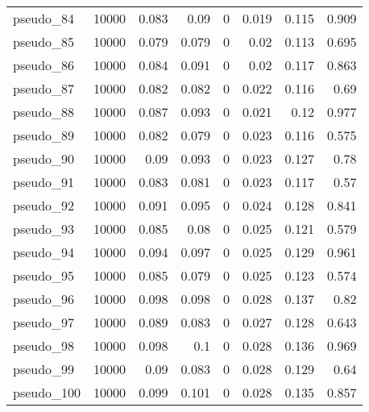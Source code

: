 \begin{table}[!htbp]
{\begin{tabular}{lrrrrrrr}
pseudo\_84 & 10000 & 0.083 & 0.09 & 0 & 0.019 & 0.115 & 0.909 \\ 
pseudo\_85 & 10000 & 0.079 & 0.079 & 0 & 0.02 & 0.113 & 0.695 \\ 
pseudo\_86 & 10000 & 0.084 & 0.091 & 0 & 0.02 & 0.117 & 0.863 \\ 
pseudo\_87 & 10000 & 0.082 & 0.082 & 0 & 0.022 & 0.116 & 0.69 \\ 
pseudo\_88 & 10000 & 0.087 & 0.093 & 0 & 0.021 & 0.12 & 0.977 \\ 
pseudo\_89 & 10000 & 0.082 & 0.079 & 0 & 0.023 & 0.116 & 0.575 \\ 
pseudo\_90 & 10000 & 0.09 & 0.093 & 0 & 0.023 & 0.127 & 0.78 \\ 
pseudo\_91 & 10000 & 0.083 & 0.081 & 0 & 0.023 & 0.117 & 0.57 \\ 
pseudo\_92 & 10000 & 0.091 & 0.095 & 0 & 0.024 & 0.128 & 0.841 \\ 
pseudo\_93 & 10000 & 0.085 & 0.08 & 0 & 0.025 & 0.121 & 0.579 \\ 
pseudo\_94 & 10000 & 0.094 & 0.097 & 0 & 0.025 & 0.129 & 0.961 \\ 
pseudo\_95 & 10000 & 0.085 & 0.079 & 0 & 0.025 & 0.123 & 0.574 \\ 
pseudo\_96 & 10000 & 0.098 & 0.098 & 0 & 0.028 & 0.137 & 0.82 \\ 
pseudo\_97 & 10000 & 0.089 & 0.083 & 0 & 0.027 & 0.128 & 0.643 \\ 
pseudo\_98 & 10000 & 0.098 & 0.1 & 0 & 0.028 & 0.136 & 0.969 \\ 
pseudo\_99 & 10000 & 0.09 & 0.083 & 0 & 0.028 & 0.129 & 0.64 \\ 
pseudo\_100 & 10000 & 0.099 & 0.101 & 0 & 0.028 & 0.135 & 0.857\\ 
\hline
\hline
\end{tabular}
}
\end{table}

